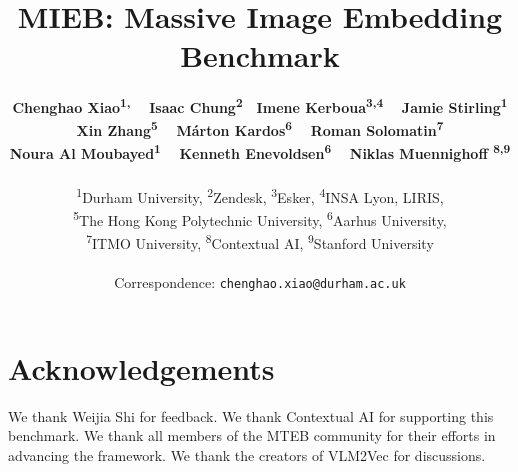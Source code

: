 \documentclass[10pt,twocolumn,letterpaper]{article}
\title{MIEB: Massive Image Embedding Benchmark}
\author{\textbf{Chenghao Xiao\textsuperscript{1,\textdagger}} \ \ 
\textbf{Isaac Chung\textsuperscript{2}}\ \ 
\textbf{Imene Kerboua\textsuperscript{3,4}} \ \ 
\textbf{Jamie Stirling\textsuperscript{1}}
\\
\textbf{Xin Zhang\textsuperscript{5}} \ \  
\textbf{Márton Kardos\textsuperscript{6}} \ \ 
\textbf{Roman Solomatin\textsuperscript{7}}
\\
\textbf{Noura Al Moubayed\textsuperscript{1}} \ \  
\textbf{Kenneth Enevoldsen\textsuperscript{6}} \ \
\textbf{Niklas Muennighoff \textsuperscript{8,9}}
\\ \\
\textsuperscript{1}Durham University,
\textsuperscript{2}Zendesk, 
\textsuperscript{3}Esker, 
\textsuperscript{4}INSA Lyon, LIRIS, \\
\textsuperscript{5}The Hong Kong Polytechnic University, 
\textsuperscript{6}Aarhus University, \\
\textsuperscript{7}ITMO University, 
\textsuperscript{8}Contextual AI, 
\textsuperscript{9}Stanford University
\\ 
\\
{\textsuperscript{\textdagger}Correspondence: \tt chenghao.xiao@durham.ac.uk}
}
\begin{document}
\maketitle



 















\section*{Acknowledgements}

We thank Weijia Shi for feedback. We thank Contextual AI for supporting this benchmark. We thank all members of the MTEB community for their efforts in advancing the framework. We thank the creators of VLM2Vec for discussions.

{
\small


}

\clearpage


% 
\end{document}
